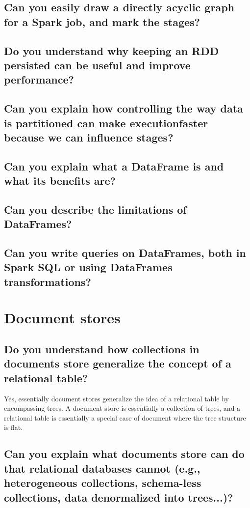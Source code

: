 \documentclass{article}
\begin{document}
\subsection{Can you easily draw a directly acyclic graph for a Spark job, and mark the stages?}
\subsection{Do you understand why keeping an RDD persisted can be useful and improve performance?}
\subsection{Can you explain how controlling the way data is partitioned can make executionfaster because we can influence stages?}
\subsection{Can you explain what a DataFrame is and what its benefits are?}
\subsection{Can you describe the limitations of DataFrames?}
\subsection{Can you write queries on DataFrames, both in Spark SQL or using DataFrames transformations?}

\pagebreak

\section{Document stores}
\subsection{Do you understand how collections in documents store generalize the concept of a relational table?}

Yes, essentially document stores generalize the idea of a relational table by encompassing trees. A document store is essentially a collection of trees, and a relational table is essentially a special case of document where the tree structure is flat.

\subsection{Can you explain what documents store can do that relational databases cannot (e.g., heterogeneous collections, schema-less collections, data denormalized into trees...)?}
\end{document}
